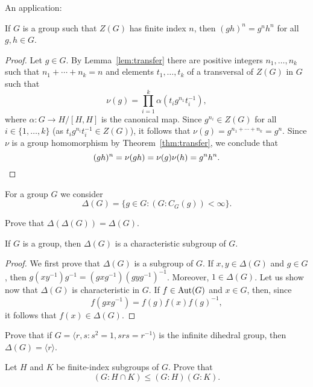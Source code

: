 
An application:

\begin{proposition}
	\label{pro:center}
	If $G$ is a group such that $Z(G)$ has finite index $n$, then
	$(gh)^n=g^nh^n$ for all $g,h\in G$.	
\end{proposition}

\begin{proof}
	Let $g\in G$. By Lemma~\ref{lem:transfer} there are positive integers 
    $n_1,\dots,n_k$ such that $n_1+\cdots+n_k=n$ and elements 
	$t_1,\dots,t_k$ of a transversal of $Z(G)$ in $G$ such that 
	\[
		\nu(g)=\prod_{i=1}^k \alpha(t_ig^{n_1}t_i^{-1}),
	\]
	where $\alpha\colon G\to H/[H,H]$ is the canonical map. Since
	$g^{n_i}\in Z(G)$ for all $i\in\{1,\dots,k\}$ (as $t_ig^{n_i}t_i^{-1}\in Z(G)$), 
	it follows that 
	$\nu(g)=g^{n_1+\cdots+n_k}=g^n$.  Since $\nu$ is a group homomorphism by 
	Theorem~\ref{thm:transfer}, we conclude that 
	\[
		(gh)^n=\nu(gh)=\nu(g)\nu(h)=g^nh^n. \qedhere 
	\]
\end{proof}

For a group $G$ we consider 
\[
	\Delta(G)=\{g\in G:(G:C_G(g))<\infty\}.
\]

\begin{exercise}
	Prove that $\Delta(\Delta(G))=\Delta(G)$.
\end{exercise}

\begin{lemma}
	If $G$ is a group, then $\Delta(G)$ 
	is a characteristic subgroup of $G$.
\end{lemma}

\begin{proof}
	We first prove that $\Delta(G)$ is a subgroup of $G$. If $x,y\in\Delta(G)$
	and $g\in G$, then $g(xy^{-1})g^{-1}=(gxg^{-1})(gyg^{-1})^{-1}$. Moreover, 
	$1\in\Delta(G)$. Let us show now that $\Delta(G)$ is characteristic in $G$. If 
	$f\in\operatorname{Aut}(G)$ and $x\in G$, then, since 
	\[
	f(gxg^{-1})=f(g)f(x)f(g)^{-1},
	\]
	it follows that $f(x)\in\Delta(G)$.
\end{proof}

\begin{exercise}
	Prove that if $G=\langle r,s:s^2=1,srs=r^{-1}\rangle$ is the
	infinite dihedral group, then $\Delta(G)=\langle r\rangle$.
\end{exercise}

\begin{exercise}
	Let $H$ and $K$ be finite-index subgroups of $G$. Prove that
	\[
	(G:H\cap K)\leq (G:H)(G:K). 
	\]
\end{exercise}

